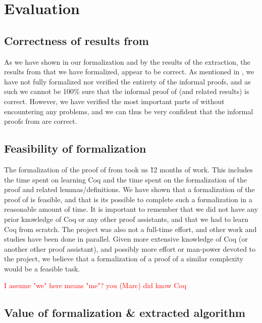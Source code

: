 \chapter{Evaluation}

\section{Correctness of results from \cite{mbezem}}

As we have shown in our formalization and by the results of the
extraction, the results from \cite{mbezem} that we have formalized, appear to be correct.
As mentioned in , we have not fully formalized nor verified the entirety of the informal proofs,
and as such we cannot be 100\% sure that the informal proof of  (and related results) is correct.
However, we have verified the most important parts of  without
encountering any problems, and we can thus be very confident that the informal proofs from \cite{mbezem} are correct.

\section{Feasibility of formalization}
\label{sec:feasibility_of_formalization}

The formalization of the proof of  from \cite{mbezem} took us \~12 months of work.
This includes the time spent on learning Coq and the time spent on the formalization of the proof
and related lemmas/definitions.
We have shown that a formalization of the proof of  is feasible,
and that is its possible to complete such a formalization in a reasonable amount of time.
It is important to remember that we did not have any prior knowledge of Coq or any other proof assistants,
and that we had to learn Coq from scratch.
The project was also not a full-time effort, and other work and studies have been done in parallel.
Given more extensive knowledge of Coq (or another other proof assistant),
and possibly more effort or man-power devoted to the project,
we believe that a formalization of a proof of a similar complexity would be a feasible task.

\textcolor{red}{I assume "we" here means "me"? you (Marc) did know Coq}

\section{Value of formalization \& extracted algorithm}

